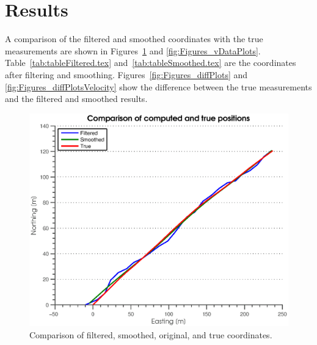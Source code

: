 

\section{Results} %
\label{sec:results}
A comparison of the filtered and smoothed coordinates with the true measurements are shown in Figures~\ref{fig:Figures_xDataPlots} and \ref{fig:Figures_vDataPlots}. Table~\ref{tab:tableFiltered.tex} and~\ref{tab:tableSmoothed.tex} are the coordinates after filtering and smoothing.  Figures~\ref{fig:Figures_diffPlots} and \ref{fig:Figures_diffPlotsVelocity} show the difference between the true measurements and the filtered and smoothed results.
\begin{figure}[htbp]
	\centering
		\includegraphics[width=\MyWidth]{Figures/xDataPlots.eps}
	\caption{Comparison of filtered, smoothed, original, and true coordinates.}
	\label{fig:Figures_xDataPlots}
\end{figure} %
